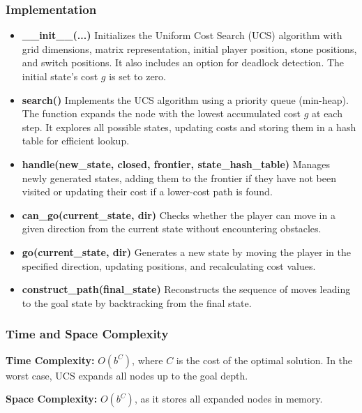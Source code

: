 \subsubsection{Implementation}
\begin{itemize}
    \item \textbf{\_\_init\_\_(...)}  
    Initializes the Uniform Cost Search (UCS) algorithm with grid dimensions, matrix representation, initial player position, stone positions, and switch positions. It also includes an option for deadlock detection. The initial state's cost \( g \) is set to zero.

    \item \textbf{search()}  
    Implements the UCS algorithm using a priority queue (min-heap). The function expands the node with the lowest accumulated cost \( g \) at each step. It explores all possible states, updating costs and storing them in a hash table for efficient lookup.

    \item \textbf{handle(new\_state, closed, frontier, state\_hash\_table)}  
    Manages newly generated states, adding them to the frontier if they have not been visited or updating their cost if a lower-cost path is found.

    \item \textbf{can\_go(current\_state, dir)}  
    Checks whether the player can move in a given direction from the current state without encountering obstacles.

    \item \textbf{go(current\_state, dir)}  
    Generates a new state by moving the player in the specified direction, updating positions, and recalculating cost values.

    \item \textbf{construct\_path(final\_state)}  
    Reconstructs the sequence of moves leading to the goal state by backtracking from the final state.
\end{itemize}

\subsubsection{Time and Space Complexity}
\textbf{Time Complexity:} \( O(b^C) \), where \( C \) is the cost of the optimal solution. In the worst case, UCS expands all nodes up to the goal depth.

\textbf{Space Complexity:} \( O(b^C) \), as it stores all expanded nodes in memory.

